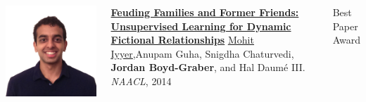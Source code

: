 \documentclass[xcolor=dvipsnames]{beamer}
\begin{document}
\begin{frame}{}

  \begin{columns}
        \includegraphics[width=0.7\linewidth]{general_figures/mohit}
        \begin{block}{ {\bf \href{http://cs.colorado.edu/~jbg//docs/2014_emnlp_qb_rnn.pdf}{Feuding Families and Former Friends: Unsupervised Learning for Dynamic Fictional Relationships}}}
\underline{\href{http://cs.umd.edu/~miyyer/}{Mohit Iyyer}},Anupam Guha, Snigdha Chaturvedi, {\bf Jordan Boyd-Graber}, and Hal {Daum\'{e} III}.  \emph{NAACL}, 2014
        \end{block}
Best Paper Award
  \end{columns}
\end{frame}
\end{document}
